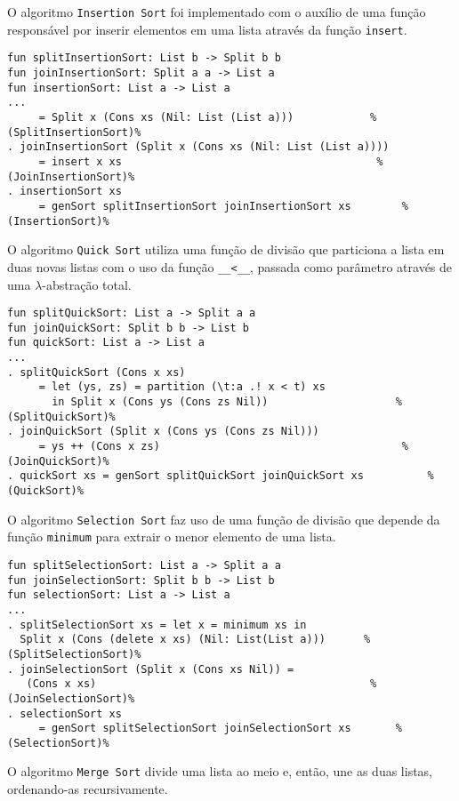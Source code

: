 O algoritmo \Verb.Insertion Sort. foi implementado com o auxílio de uma função responsável por inserir elementos em uma lista através da função \Verb.insert..

\begin{Verbatim}
fun splitInsertionSort: List b -> Split b b
fun joinInsertionSort: Split a a -> List a
fun insertionSort: List a -> List a
...
     = Split x (Cons xs (Nil: List (List a)))            %(SplitInsertionSort)%
. joinInsertionSort (Split x (Cons xs (Nil: List (List a)))) 
     = insert x xs                                        %(JoinInsertionSort)%
. insertionSort xs 
     = genSort splitInsertionSort joinInsertionSort xs        %(InsertionSort)%
\end{Verbatim}

O algoritmo \Verb.Quick Sort. utiliza uma função de divisão que particiona a lista em duas novas listas com o uso da função \Verb.__<__., passada como parâmetro através de uma $\lambda$-abstração total.

\begin{Verbatim}
fun splitQuickSort: List a -> Split a a
fun joinQuickSort: Split b b -> List b
fun quickSort: List a -> List a
...
. splitQuickSort (Cons x xs) 
     = let (ys, zs) = partition (\t:a .! x < t) xs
       in Split x (Cons ys (Cons zs Nil))                    %(SplitQuickSort)%
. joinQuickSort (Split x (Cons ys (Cons zs Nil))) 
     = ys ++ (Cons x zs)                                      %(JoinQuickSort)%
. quickSort xs = genSort splitQuickSort joinQuickSort xs          %(QuickSort)%
\end{Verbatim}

O algoritmo \Verb.Selection Sort. faz uso de uma função de divisão que depende da função \Verb.minimum. para extrair o menor elemento de uma lista.

\begin{Verbatim}
fun splitSelectionSort: List a -> Split a a
fun joinSelectionSort: Split b b -> List b
fun selectionSort: List a -> List a
...
. splitSelectionSort xs = let x = minimum xs in
  Split x (Cons (delete x xs) (Nil: List(List a)))      %(SplitSelectionSort)%
. joinSelectionSort (Split x (Cons xs Nil)) =
   (Cons x xs)                                           %(JoinSelectionSort)%
. selectionSort xs
     = genSort splitSelectionSort joinSelectionSort xs       %(SelectionSort)%
\end{Verbatim}

O algoritmo \Verb.Merge Sort. divide uma lista ao meio e, então, une as duas listas, ordenando-as recursivamente.


